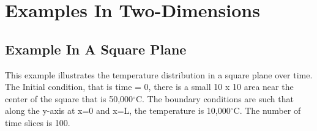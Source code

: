 \documentclass[11pt]{article}
\begin{document}
    \hypertarget{examples-in-two-dimensions}{%
\section{Examples In Two-Dimensions}\label{examples-in-two-dimensions}}

    \hypertarget{example-in-a-square-plane}{%
\subsection{Example In A Square Plane}\label{example-in-a-square-plane}}

    This example illustrates the temperature distribution in a square plane
over time. The Initial condition, that is time = 0, there is a small 10
x 10 area near the center of the square that is 50,000\(^{\circ}\)C. The
boundary conditions are such that along the y-axis at x=0 and x=L, the
temperature is 10,000\(^{\circ}\)C. The number of time slices is 100.
\end{document}
